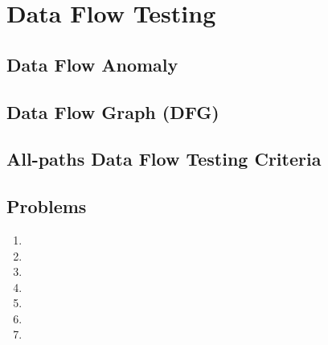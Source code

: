 \chapter{Data Flow Testing}
\section{Data Flow Anomaly}
\section{Data Flow Graph (DFG)}
\section{All-paths Data Flow Testing Criteria}
\section{Problems}
\begin{enumerate}
    \item 
    \item 
    \item 
    \item 
    \item 
    \item
    \item 
\end{enumerate}